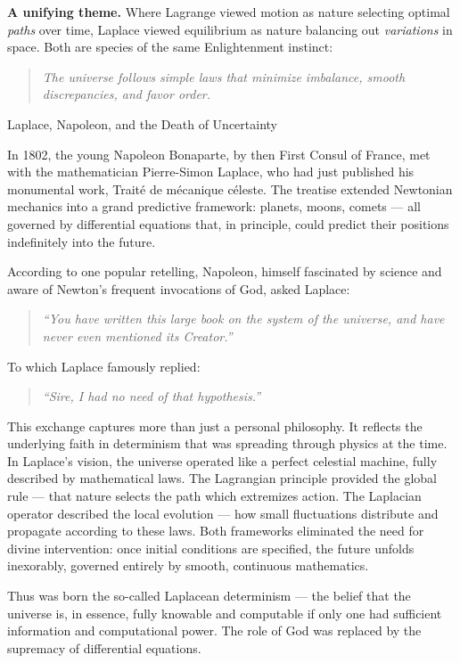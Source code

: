 \medskip

\noindent\textbf{A unifying theme.}  
Where Lagrange viewed motion as nature selecting optimal \emph{paths} over time, Laplace viewed equilibrium as nature balancing out \emph{variations} in space. Both are species of the same Enlightenment instinct:  
\begin{quote}
    \emph{The universe follows simple laws that minimize imbalance, smooth discrepancies, and favor order.}
\end{quote}

\begin{HistoricalSidebar}{Laplace, Napoleon, and the Death of Uncertainty}

In 1802, the young Napoleon Bonaparte, by then First Consul of France, met with the mathematician Pierre-Simon Laplace, 
who had just published his monumental work, Traité de mécanique céleste. The treatise extended Newtonian mechanics 
into a grand predictive framework: planets, moons, comets — all governed by differential equations that, in principle, 
could predict their positions indefinitely into the future.

According to one popular retelling, Napoleon, himself fascinated by science and aware of Newton's frequent invocations 
of God, asked Laplace:

\begin{quote}
\emph{“You have written this large book on the system of the universe, and have never even mentioned its Creator.”}
\end{quote}
To which Laplace famously replied:
\begin{quote}
\emph{“Sire, I had no need of that hypothesis.”}
\end{quote}

This exchange captures more than just a personal philosophy. It reflects the underlying faith in determinism that 
was spreading through physics at the time. In Laplace’s vision, the universe operated like a perfect celestial 
machine, fully described by mathematical laws. The Lagrangian principle provided the global rule — that nature 
selects the path which extremizes action. The Laplacian operator described the local evolution — how small 
fluctuations distribute and propagate according to these laws. Both frameworks eliminated the need for divine 
intervention: once initial conditions are specified, the future unfolds inexorably, governed entirely by smooth, 
continuous mathematics.

Thus was born the so-called Laplacean determinism — the belief that the universe is, in essence, fully knowable 
and computable if only one had sufficient information and computational power. The role of God was replaced by 
the supremacy of differential equations.
\end{HistoricalSidebar}





















